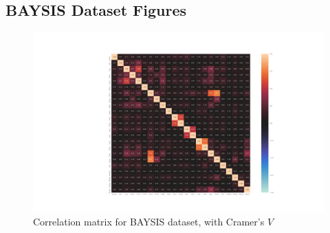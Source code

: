 \documentclass[a4paper,12pt]{report}
\newcommand{\nocontentsline}[3]{}
\newcommand{\tocless}[2]{\bgroup\let\addcontentsline=\nocontentsline#1{#2}\egroup}
\begin{document}

{}

\listoffigures

\listoftables

\printglossary[title=List of Acronyms, type=\acronymtype]

\printglossary[title=List of Terms]

\begin{appendices}

\chapter{BAYSIS Dataset Figures}
\label{appendix_baysis}

\begin{figure}[h]
	\centering
	\includegraphics[scale=0.4]{../CorrAnalysis/data/BAYSIS/01_dataset/plots/baysis_dataset_corr_cramers}
	\caption{Correlation matrix for BAYSIS dataset, with Cramer's $V$}
	\label{img:appendix_correlation_matrix_dataset_cramers}
\end{figure}
\restoregeometry


\end{appendices}
\end{document}
